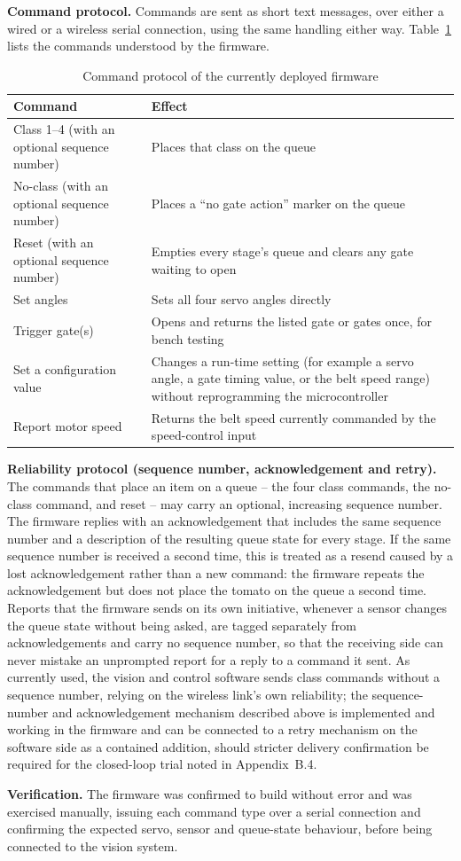 \textbf{Command protocol.} Commands are sent as short text messages, over either a wired or a wireless serial connection, using the same handling either way. Table~\ref{tab:appendixC_protocol} lists the commands understood by the firmware.

\begin{table}[H]
\caption{Command protocol of the currently deployed firmware}
\label{tab:appendixC_protocol}
\centering
\begin{tabularx}{\textwidth}{>{\raggedright\arraybackslash}p{6.5cm} >{\raggedright\arraybackslash}X}
\toprule
\textbf{Command} & \textbf{Effect} \\
\midrule
Class 1--4 (with an optional sequence number) & Places that class on the queue \\
No-class (with an optional sequence number) & Places a ``no gate action'' marker on the queue \\
Reset (with an optional sequence number) & Empties every stage's queue and clears any gate waiting to open \\
Set angles & Sets all four servo angles directly \\
Trigger gate(s) & Opens and returns the listed gate or gates once, for bench testing \\
Set a configuration value & Changes a run-time setting (for example a servo angle, a gate timing value, or the belt speed range) without reprogramming the microcontroller \\
Report motor speed & Returns the belt speed currently commanded by the speed-control input \\
\bottomrule
\end{tabularx}
\end{table}

\textbf{Reliability protocol (sequence number, acknowledgement and retry).} The commands that place an item on a queue -- the four class commands, the no-class command, and reset -- may carry an optional, increasing sequence number. The firmware replies with an acknowledgement that includes the same sequence number and a description of the resulting queue state for every stage. If the same sequence number is received a second time, this is treated as a resend caused by a lost acknowledgement rather than a new command: the firmware repeats the acknowledgement but does not place the tomato on the queue a second time. Reports that the firmware sends on its own initiative, whenever a sensor changes the queue state without being asked, are tagged separately from acknowledgements and carry no sequence number, so that the receiving side can never mistake an unprompted report for a reply to a command it sent. As currently used, the vision and control software sends class commands without a sequence number, relying on the wireless link's own reliability; the sequence-number and acknowledgement mechanism described above is implemented and working in the firmware and can be connected to a retry mechanism on the software side as a contained addition, should stricter delivery confirmation be required for the closed-loop trial noted in Appendix~B.4.

\textbf{Verification.} The firmware was confirmed to build without error and was exercised manually, issuing each command type over a serial connection and confirming the expected servo, sensor and queue-state behaviour, before being connected to the vision system.

\clearpage